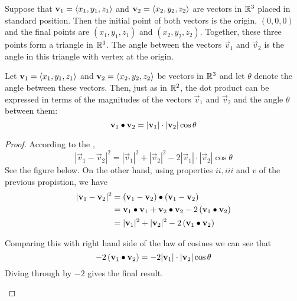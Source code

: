 \documentclass[handout]{ximera}
\begin{document}
Suppose that $\mathbf{v}_1=\left\langle x_1, y_1, z_1\right\rangle$ and $\mathbf{v}_2=\left\langle x_2, y_2, z_2\right\rangle$  are vectors in $\mathbb R^3$ placed in standard position.  
Then the initial point of both vectors is the origin, $(0,0,0)$ and the final points are
$(x_1, y_1, z_1)$ and $(x_2, y_2, z_2)$.  Together, these three points form a triangle in $\mathbb R^3$.  
The angle between the vectors $\vec{v}_1$ and $\vec{v}_2$ is the angle in this triangle with vertex at the origin.

\begin{proposition}
Let $\mathbf{v}_1 = \left\langle x_1, y_1, z_1\right\rangle$ and $\mathbf{v}_2 = \left\langle x_2, y_2, z_2\right\rangle$
be vectors in $\mathbb R^3$ and let $\theta$ denote the angle between these vectors.  Then, just as in $\mathbb R^2$, the dot product can be expressed in terms of the 
magnitudes of the vectors $\vec{v}_1$ and $\vec{v}_2$ and the angle $\theta$ between them:
\[
\mathbf{v}_1\bullet\mathbf{v}_2 = |\mathbf{v}_1|\cdot |\mathbf{v}_2| \cos\theta
\]
\begin{proof}
According to the , 
\[
|\vec{v}_1 - \vec{v}_2|^2 = |\vec{v}_1|^2 + |\vec{v}_2|^2 - 2|\vec{v}_1|\cdot| \vec{v}_2|\cos \theta
\]
See the figure below. On the other hand, using properties $ii, iii$ and $v$ of the previous propistion, we have
\begin{align*}
|\mathbf{v}_1 - \mathbf{v}_2|^2 &= \left(\mathbf{v}_1 - \mathbf{v}_2\right)\bullet \left(\mathbf{v}_1 - \mathbf{v}_2\right)\\
                          &= \mathbf{v}_1 \bullet \mathbf{v}_1 + \mathbf{v}_2 \bullet \mathbf{v}_2 - 2\left(\mathbf{v}_1 \bullet \mathbf{v}_2\right)\\
                          &=|\mathbf{v}_1|^2 + |\mathbf{v}_2|^2 - 2\left(\mathbf{v}_1 \bullet \mathbf{v}_2\right)
\end{align*}

Comparing this with right hand side of the law of cosines we can see that
\[
- 2\left(\mathbf{v}_1 \bullet \mathbf{v}_2\right) = - 2|\mathbf{v}_1|\cdot| \mathbf{v}_2|\cos \theta
\]
Diving through by $-2$ gives the final result.

\begin{image}
\end{image}

\end{proof}

\end{proposition}
\end{document}
